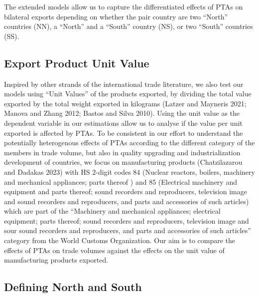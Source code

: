 \documentclass[12pt]{article}%
\begin{document}
The extended models allow us to capture the differentiated effects of
PTAs on bilateral exports depending on whether the pair country are two
``North'' countries (NN), a ``North'' and a ``South'' country (NS), or
two ``South'' countries (SS).

%
\subsection{Export Product Unit Value}%
\label{subsec:ExportProductUnitValue}%

%
Inspired by other strands of the international trade literature, we also
test our models using ``Unit Values'' of the products exported, by
dividing the total value exported by the total weight exported in
kilograms (Latzer and Mayneris 2021; Manova and Zhang 2012; Bastos and
Silva 2010). Using the unit value as the dependent variable in our
estimations allow us to analyse if the value per unit exported is
affected by PTAs. To be consistent in our effort to understand the
potentially heterogenous effects of PTAs according to the different
category of the members in trade volume, but also in quality upgrading
and industrialization development of countries, we focus on
manufacturing products (Chatzilazarou and Dadakas 2023) with HS 2-digit
codes 84 (Nuclear reactors, boilers, machinery and mechanical
appliances; parts thereof ) and 85 (Electrical machinery and equipment
and parts thereof; sound recorders and reproducers, television image and
sound recorders and reproducers, and parts and accessories of such
articles) which are part of the ``Machinery and mechanical appliances;
electrical equipment; parts thereof; sound recorders and reproducers,
television image and sour sound recorders and reproducers, and parts and
accessories of such articles'' category from the World Customs
Organization. Our aim is to compare the effects of PTAs on trade volumes
against the effects on the unit value of manufacturing products
exported.%
\subsection{Defining North and South}%
\label{subsec:DefiningNorthandSouth}%
\end{document}
